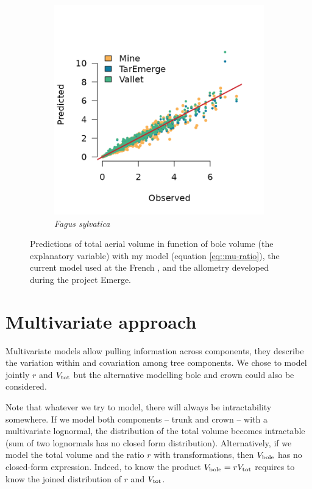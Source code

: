 \begin{figure}[h]
\begin{subfigure}{0.4\textwidth}
		\includegraphics{./Figures/fagSyl-pred.png}
		\caption{\textit{Fagus sylvatica}}
	\end{subfigure}
	\caption{Predictions of total aerial volume in function of bole volume (the explanatory variable) with my model (equation \eqref{eq::mu-ratio}), the current model used at the French \NFI \parencite{Vallet2006}, and the allometry developed during the project Emerge.}
	\label{fig::pred-ratio}
\end{figure}

\section{Multivariate approach}

Multivariate models allow pulling information across components, \ie they describe the variation within and covariation among tree components. We chose to model jointly \( r \) and \( V_{\text{tot}} \) but the alternative modelling bole and crown could also be considered.

\begin{tcolorbox}[breakable, title = Intractability]
Note that whatever we try to model, there will always be intractability somewhere. If we model both components -- trunk and crown -- with a multivariate lognormal, the distribution of the total volume becomes intractable (sum of two lognormals has no closed form distribution). Alternatively, if we model the total volume and the ratio \( r \) with transformations, then \( V_{\text{bole}} \) has no closed-form expression. Indeed, to know the product \( V_{\text{bole}} = rV_{\text{tot}} \) requires to know the joined distribution of \( r \) and \( V_{\text{tot}} \).
\end{tcolorbox}

